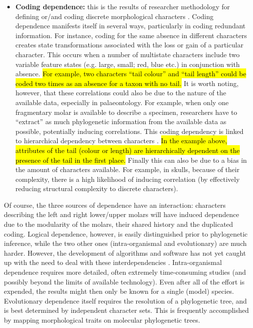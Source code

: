 \documentclass[12pt,letterpaper]{article}
\begin{document}
\begin{itemize}
    \item \textbf{Coding dependence:} this is the results of researcher methodology for defining or/and coding discrete morphological characters \citep{Brazeau2011,simoes2017giant}.
    Coding dependence manifests itself in several ways, particularly in coding redundant information.
    For instance, coding for the same absence in different characters creates state transformations associated with the loss or gain of a particular character.
    This occurs when a number of multistate characters include two variable feature states (e.g. large, small; red, blue etc.) in conjunction with absence.
    \hl{For example, two characters ``tail colour'' and ``tail length'' could be coded two times as an absence for a taxon with no tail.}
    It is worth noting, however, that these correlations could also be due to the nature of the available data, especially in palaeontology.
    For example, when only one fragmentary molar is available to describe a specimen, researchers have to ``extract'' as much phylogenetic information from the available data as possible, potentially inducing correlations.
    This coding dependency is linked to hierarchical dependency between characters \citep{wilkinson1995coping,BrazeauNA}.
    \hl{In the example above, attributes of the tail (colour or length) are hierarchically dependent on the presence of the tail in the first place.}
    Finally this can also be due to a bias in the amount of characters available.
    For example, in skulls, because of their complexity, there is a high likelihood of inducing correlation (by effectively reducing structural complexity to discrete characters).
\end{itemize}

\noindent Of course, the three sources of dependence have an interaction: characters describing the left and right lower/upper molars will have induced dependence due to the modularity of the molars, their shared history and the duplicated coding.
Logical dependence, however, is easily distinguished prior to phylogenetic inference, while the two other ones (intra-organismal and evolutionary) are much harder.
However, the development of algorithms and software has not yet caught up with the need to deal with these interdependencies \citep{de2015parsimony,BrazeauNA}.
Intra-organismal dependence requires more detailed, often extremely time-consuming studies (and possibly beyond the limits of available technology).
Even after all of the effort is expended, the results might then only be known for a single (model) species.
Evolutionary dependence itself requires the resolution of a phylogenetic tree, and is best determined by independent character sets. 
This is frequently accomplished by mapping morphological traits on molecular phylogenetic trees.
\end{document}
